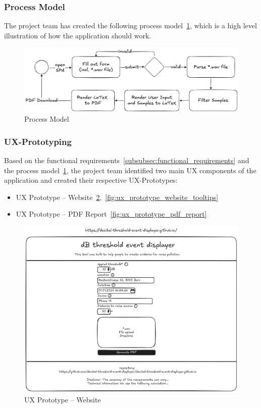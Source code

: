 \subsubsection{Process Model}\label{subsubsec:process_model}
The project team has created the following process model~\ref{fig:process_model}, which is a high level illustration of how the application should work.

\begin{figure}[H]
    \centering
    \includegraphics[width=1\textwidth]{../assets/process_model.png}
    \caption{Process Model}\label{fig:process_model}
\end{figure}

\subsubsection{UX-Prototyping}\label{subsubsec:ux_prototyping}
Based on the functional requirements~\ref{subsubsec:functional_requirements} and the process model~\ref{fig:process_model}, the project team identified two main UX components of the application and created their respective UX-Prototypes:
\begin{itemize}
    \item UX Prototype – Website~\ref{fig:ux_prototype_website},~\ref{fig:ux_prototype_website_tooltips}
    \item UX Prototype – PDF Report~\ref{fig:ux_prototype_pdf_report}
\end{itemize}

\begin{figure}[H]
    \centering
    \includegraphics[width=1\textwidth]{../assets/ux_prototype_website.png}
    \caption{UX Prototype – Website}\label{fig:ux_prototype_website}
\end{figure}


